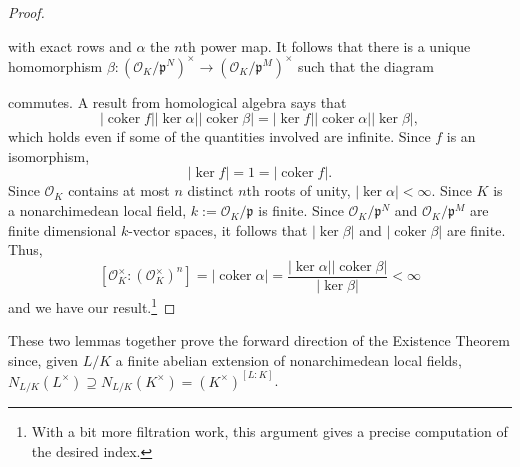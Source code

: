 \documentclass[11pt]{article}
\newcommand{\df}{\dfrac}
\newcommand{\mc}[1]{\mathcal{#1}}
\newcommand{\mf}[1]{\mathfrak{#1}}
\DeclareMathOperator{\coker}{coker}
\renewcommand{\supset}{\supseteq}
\renewcommand{\O}{\mc{O}}
\begin{document}
\begin{proof}
\begin{center}
\end{center}
with exact rows and $\alpha$ the $n$th power map. It follows that there is a unique homomorphism $\beta: (\O_K/\mf{p}^N)^{\times}\to(\O_K/\mf{p}^M)^{\times}$ such that the diagram 
\begin{center}
\end{center}
commutes. A result from homological algebra says that 
$$|\coker f||\ker\alpha||\coker\beta|=|\ker f||\coker\alpha||\ker\beta|,$$
which holds even if some of the quantities involved are infinite. Since $f$ is an isomorphism, 
$$|\ker f|=1=|\coker f|.$$ 
Since $\O_K$ contains at most $n$ distinct $n$th roots of unity, $|\ker\alpha|<\infty$. Since $K$ is a nonarchimedean local field, $k:=\O_K/\mf{p}$ is finite. Since $\O_K/\mf{p}^N$ and $\O_K/\mf{p}^M$ are finite dimensional $k$-vector spaces, it follows that $|\ker\beta|$ and $|\coker\beta|$ are finite. Thus,
$$[\O_K^{\times}:(\O_K^{\times})^n]=|\coker\alpha|=\df{|\ker\alpha||\coker\beta|}{|\ker\beta|}<\infty$$
and we have our result.\footnote{With a bit more filtration work, this argument gives a precise computation of the desired index.}
\end{proof}

These two lemmas together prove the forward direction of the Existence Theorem since, given $L/K$ a finite abelian extension of nonarchimedean local fields, $N_{L/K}(L^{\times})\supset N_{L/K}(K^{\times})=(K^{\times})^{[L:K]}$.
\end{document}
